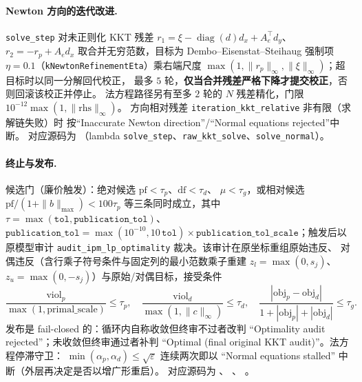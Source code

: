 \paragraph{Newton 方向的迭代改进.}
\texttt{solve\_step} 对未正则化 KKT 残差
$r_1 = \xi - \operatorname{diag}(d) d_x + A_e^{\top} d_y$、
$r_2 = -r_p + A_e d_x$ 取合并无穷范数，目标为 Dembo--Eisenstat--Steihaug
强制项 $\eta = 0.1$（\texttt{kNewtonRefinementEta}）乘右端尺度
$\max(1, \|r_p\|_{\infty}, \|\xi\|_{\infty})$；超目标时以同一分解回代校正，
最多 $5$ 轮，\textbf{仅当合并残差严格下降才提交校正}，否则回滚该校正并停止。
法方程路径另有至多 $2$ 轮的 $N$ 残差精化，门限
$10^{-12}\max(1, \|\mathrm{rhs}\|_{\infty})$。
方向相对残差 \texttt{iteration\_kkt\_relative} 非有限（求解链失败）时
按``Inaccurate Newton direction''/``Normal equations rejected''中断。
对应源码为 
（lambda \texttt{solve\_step}、\texttt{raw\_kkt\_solve}、\texttt{solve\_normal}）。

\paragraph{终止与发布.}
候选门（廉价触发）：绝对候选 $\mathrm{pf} < \tau_p$、$\mathrm{df} < \tau_d$、
$\mu < \tau_g$，或相对候选
$\mathrm{pf}/(1+\|b\|_{\max}) < 100 \tau_p$ 等三条同时成立，其中
$\tau = \max(\texttt{tol}, \texttt{publication\_tol})$、
$\texttt{publication\_tol} = \max(10^{-10}, 10\,\texttt{tol}) \times
\texttt{publication\_tol\_scale}$；触发后以原模型审计
\texttt{audit\_ipm\_lp\_optimality} 裁决。该审计在原坐标重组原始违反、
对偶违反（含行乘子符号条件与固定列的最小范数乘子重建
$z_l = \max(0, s_j)$、$z_u = \max(0, -s_j)$）与原始/对偶目标，接受条件
\begin{equation}
  \frac{\mathrm{viol}_p}{\max(1, \mathrm{primal\_scale})} \le \tau_p,\quad
  \frac{\mathrm{viol}_d}{\max(1, \|c\|_{\infty})} \le \tau_d,\quad
  \frac{|\mathrm{obj}_p - \mathrm{obj}_d|}
  {1 + |\mathrm{obj}_p| + |\mathrm{obj}_d|} \le \tau_g .
  \label{eq:ipmlp:audit}
\end{equation}
发布是 fail-closed 的：循环内自称收敛但终审不过者改判
``Optimality audit rejected''；未收敛但终审通过者补判
``Optimal (final original KKT audit)''。法方程停滞守卫：
$\min(\alpha_p, \alpha_d) \le \sqrt{\varepsilon}$ 连续两次即以
``Normal equations stalled'' 中断（外层再决定是否以增广形重启）。
对应源码为 、
、
。

